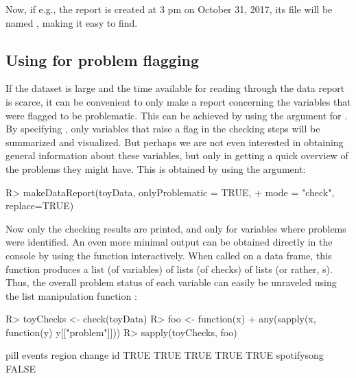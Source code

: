 \documentclass[article,shortnames]{jss}
\begin{document}
Now, if e.g., the report is created at 3 pm on October 31, 2017, its file will be named , making it easy to find. 


\subsection[Using dataMaid for problem flagging]{Using  for problem flagging}
If the dataset is large and the time available for reading through the data report is scarce, it can be convenient to only make a report concerning the variables that were flagged to be problematic. This can be achieved by using the  argument for
. By specifying , only
variables that raise a flag in the checking steps will be summarized
and visualized. But perhaps we are not even interested in obtaining
general information about these variables, but only in getting a quick
overview of the problems they might have. This is obtained by
using the  argument:


\begin{Schunk}
\begin{Sinput}
R> makeDataReport(toyData, onlyProblematic = TRUE, 
+    mode = "check", replace=TRUE)
\end{Sinput}
\end{Schunk}

Now only the checking results are printed, and only for variables
where problems were identified. An even more minimal output  can be obtained directly in the console by using the  function interactively. When called on a data frame, this function produces a list (of
variables) of lists (of checks) of lists (or rather,
s). Thus, the overall problem status of each variable
can easily be unraveled using the list manipulation function
:

\begin{Schunk}
\begin{Sinput}
R> toyChecks <- check(toyData)
R> foo <- function(x) {
+    any(sapply(x, function(y) y[["problem"]])) }
R> sapply(toyChecks, foo)
\end{Sinput}
\begin{Soutput}
       pill      events      region      change          id 
       TRUE        TRUE        TRUE        TRUE        TRUE 
spotifysong 
      FALSE 
\end{Soutput}
\end{Schunk}
\end{document}

